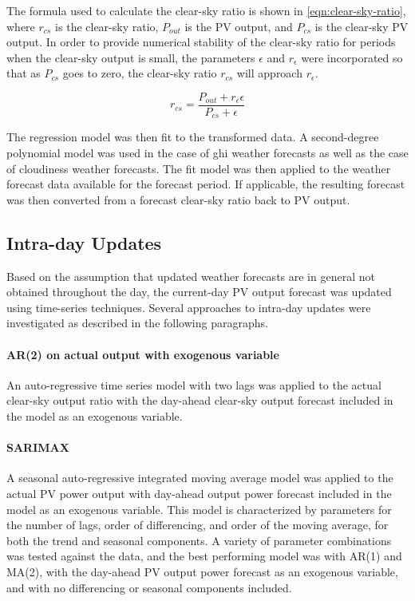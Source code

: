 The formula used to calculate the clear-sky ratio is shown in \cref{eqn:clear-sky-ratio},
where $r_{cs}$ is the clear-sky ratio, $P_{out}$ is the PV output, and $P_{cs}$ is the clear-sky PV output.
In order to provide numerical stability of the clear-sky ratio for periods when the clear-sky output is small, the parameters $\epsilon$ and $r_\epsilon$ were incorporated so that as $P_{cs}$ goes to zero, the clear-sky ratio $r_{cs}$ will approach $r_\epsilon$.

\begin{equation}
	\label{eqn:clear-sky-ratio}
	r_{cs} = \frac{P_{out} + r_\epsilon \epsilon}{P_{cs} + \epsilon}
\end{equation}

The regression model was then fit to the transformed data.
A second-degree polynomial model was used in the case of ghi weather forecasts as well as the case of cloudiness weather forecasts.
The fit model was then applied to the weather forecast data available for the forecast period.
If applicable, the resulting forecast was then converted from a forecast clear-sky ratio back to PV output.

\subsection{Intra-day Updates}
\label{sec:method-intraday}

Based on the assumption that updated weather forecasts are in general not obtained throughout the day, the current-day PV output forecast was updated using time-series techniques. Several approaches to intra-day updates were investigated as described in the following paragraphs.

\paragraph{AR(2) on actual output with exogenous variable}
An auto-regressive time series model with two lags was applied to the actual clear-sky output ratio with the day-ahead clear-sky output forecast included in the model as an exogenous variable.

\paragraph{SARIMAX}
A seasonal auto-regressive integrated moving average model was applied to the actual PV power output with day-ahead output power forecast included in the model as an exogenous variable.
This model is characterized by parameters for the number of lags, order of differencing, and order of the moving average, for both the trend and seasonal components.
A variety of parameter combinations was tested against the data, and the best performing model was with AR(1) and MA(2), with the day-ahead PV output power forecast as an exogenous variable, and with no differencing or seasonal components included.

